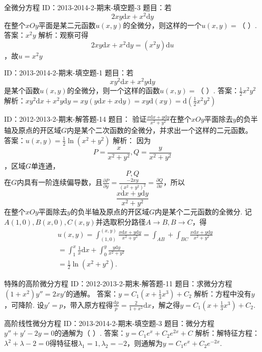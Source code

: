 全微分方程
ID：2013-2014-2-期末-填空题-3
题目：若\[2xy\text{d}x+{{x}^{2}}\text{d}y\]在整个$xOy$平面是某二元函数$u\left( x,y \right)$的全微分，则这样的一个$u\left( x,y \right)=$（    ）.
答案：${{x}^{2}}y$
解析：观察可得\[2xy\text{d}x+{{x}^{2}}\text{d}y=\left( {{x}^{2}}y \right)\text{d}u\]，故$u={{x}^{2}}y$

ID：2013-2014-2-期末-填空题-1
题目：若\[x{{y}^{2}}\text{d}x+{{x}^{2}}y\text{d}y\]是某个函数$u\left( x,y \right)$的全微分，则一个这样的函数$u\left( x,y \right)=$（    ）.
答案：$\frac{1}{2}{{x}^{2}}{{y}^{2}}$
解析：$x{{y}^{2}}\text{d}x+{{x}^{2}}y\text{d}y=xy\left( y\text{d}x+x\text{d}y \right)=xy\text{d}\left( xy \right)=\text{d}\left( \frac{1}{2}{{x}^{2}}{{y}^{2}} \right)$

ID：2012-2013-2-期末-解答题-14
题目：
验证$\frac{x\text{d}x+y\text{d}y}{{{x}^{2}}+{{y}^{2}}}$在整个$xOy$平面除去$y$的负半轴及原点的开区域$G$内是某个二次函数的全微分，并求出一个这样的二元函数。
答案：$u\left( x,y \right)=\frac{1}{2}\ln \left( {{x}^{2}}+{{y}^{2}} \right)$
解析：
因为\[P=\frac{x}{{{x}^{2}}+{{y}^{2}}},Q=\frac{y}{{{x}^{2}}+{{y}^{2}}}\]，区域$G$单连通，\[P,Q\]在$G$内具有一阶连续偏导数，且$\frac{\partial P}{\partial y}=\frac{-2xy}{{{\left( {{x}^{2}}+{{y}^{2}} \right)}^{2}}}=\frac{\partial Q}{\partial x}$，所以\[\frac{x\text{d}x+y\text{d}y}{{{x}^{2}}+{{y}^{2}}}\]在整个$xOy$平面除去$y$的负半轴及原点的开区域$G$内是某个二元函数的全微分. 记$A\left( 1,0 \right),B\left( x,0 \right),C\left( x,y \right)$并选取积分路径$A\to B,B\to C$，得
	\[\begin{align}
  & u\left( x,y \right)=\int_{\left( 1,0 \right)}^{\left( x,y \right)}{\frac{x\text{d}x+y\text{d}y}{{{x}^{2}}+{{y}^{2}}}}=\int_{AB}{+}\int_{BC}{\frac{x\text{d}x+y\text{d}y}{{{x}^{2}}+{{y}^{2}}}} \\ 
 & =\int_{1}^{x}{\frac{1}{x}\text{d}x}+\int_{0}^{y}{\frac{y\text{d}y}{{{x}^{2}}+{{y}^{2}}}} \\ 
 & =\frac{1}{2}\ln \left( {{x}^{2}}+{{y}^{2}} \right).  
\end{align}\] 


特殊的高阶微分方程
ID：2012-2013-2-期末-解答题-11
题目：求微分方程$\left( 1+{{x}^{2}} \right){y}''=2x{y}'$的通解。
答案：$y={{C}_{1}}\left( x+\frac{1}{3}{{x}^{3}} \right)+{{C}_{2}}$
解析：方程中没有$y$，可降阶. 设${y}'=p$，带入原方程得$\frac{\text{d}p}{p}=\frac{2}{1+{{x}^{2}}}\text{d}x$，解之得$y={{C}_{1}}\left( x+\frac{1}{3}{{x}^{3}} \right)+{{C}_{2}}$.

高阶线性微分方程
ID：2013-2014-2-期末-填空题-3
题目：微分方程${y}''+{y}'-2y=0$的通解为（    ）.
答案：$y={{C}_{1}}{{e}^{x}}+{{C}_{2}}{{e}^{2x}}+C$
解析：解特征方程：${{\lambda }^{2}}+\lambda -2=0$得特征根${{\lambda }_{1}}=1,{{\lambda }_{2}}=-2$，则通解为$y={{C}_{1}}{{e}^{x}}+{{C}_{2}}{{e}^{-2x}}$.

